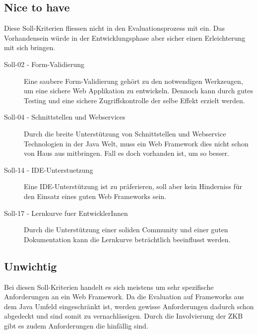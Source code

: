   \subsection{Nice to have}
  
  Diese Soll-Kriterien fliessen nicht in den Evaluationsprozess mit ein. Das
  Vorhandensein würde in der Entwicklungsphase aber sicher einen Erleichterung
  mit sich bringen.
  
  \begin{description}
  \item[Soll-02 - Form-Validierung]
  Eine saubere Form-Validierung gehört zu den notwendigen Werkzeugen, um eine
  sichere Web Applikation zu entwickeln. Dennoch kann durch gutes Testing und
  eine sichere Zugriffskontrolle der selbe Effekt erzielt werden.
  
  \item[Soll-04 - Schnittstellen und Webservices]
  Durch die breite Unterstützung von Schnittstellen und Webservice Technologien
  in der Java Welt, muss ein Web Framework dies nicht schon von Haus aus
  mitbringen. Fall es doch vorhanden ist, um so besser.
  
  \item[Soll-14 - IDE-Unterstuetzung]
  Eine IDE-Unterstützung ist zu präferieren, soll aber kein Hinderniss für den
  Einsatz eines guten Web Frameworks sein.
  
  \item[Soll-17 - Lernkurve fuer EntwicklerInnen]
  Durch die Unterstützung einer soliden Community und einer guten Dokumentation
  kann die Lernkurve beträchtlich beeinflusst werden.
  
  \end{description}
  
  \subsection{Unwichtig}
  
  Bei diesen Soll-Kriterien handelt es sich meistens um sehr spezifische
  Anforderungen an ein Web Framework. Da die Evaluation auf Frameworks aus dem
  Java Umfeld eingeschränkt ist, werden gewisse Anforderungen dadurch schon
  abgedeckt und sind somit zu vernachlässigen. Durch die Involvierung der
  \ac{ZKB} gibt es zudem Anforderungen die hinfällig sind.
  
